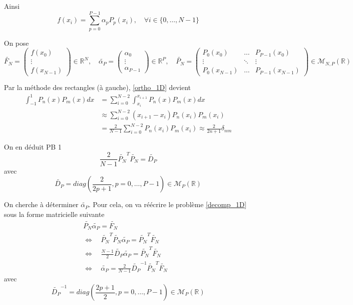 Ainsi
$$f(x_i)=\sum_{p=0}^{P-1}\alpha_p P_p(x_i), \quad \forall i\in\{0,\dots,N-1\}$$

On pose
$$\widetilde{F_N}=\begin{pmatrix}
	f(x_0) \\
	\vdots \\
	f(x_{N-1})
\end{pmatrix}\in\mathbb{R}^N, \quad \widetilde{\alpha_P}=\begin{pmatrix}
	\alpha_0 \\
	\vdots \\
	\alpha_{P-1}
\end{pmatrix}\in\mathbb{R}^P, \quad \widetilde{P_N}=\begin{pmatrix}
	P_0(x_0) & \dots & P_{P-1}(x_0) \\
	\vdots & \ddots & \vdots \\
	P_0(x_{N-1}) & \dots & P_{P-1}(x_{N-1})
\end{pmatrix}\in\mathcal{M}_{N,P}(\mathbb{R})$$

Par la méthode des rectangles (à gauche), \ref{ortho_1D} devient
\begin{align*}
	\int_{-1}^1 P_n(x)P_m(x)dx&=\sum_{i=0}^{N-2}\int_{x_i}^{x_{i+1}}P_n(x)P_m(x)dx \\
	&\approx \sum_{i=0}^{N-2} (x_{i+1}-x_i)P_n(x_i)P_m(x_i) \\
	&=\frac{2}{N-1}\sum_{i=0}^{N-2} P_n(x_i)P_m(x_i) \approx\frac{2}{2n+1}\delta_{nm} 
\end{align*}

On en déduit \color{red}PB 1\color{black}
\begin{equation}
	\frac{2}{N-1}\widetilde{P_N}^T\widetilde{P_N}=\widetilde{D_P}\label{diag_1D}
\end{equation}
avec
$$\widetilde{D_P}=diag\left(\frac{2}{2p+1},p=0,\dots,P-1\right)\in\mathcal{M}_P(\mathbb{R})$$

On cherche à déterminer $\widetilde{\alpha_P}$. Pour cela, on va réécrire le problème \ref{decomp_1D} sous la forme matricielle suivante
\begin{align*}
	\widetilde{P_N}\widetilde{\alpha_P}=\widetilde{F_N}& \\
	\iff \quad \widetilde{P_N}^T\widetilde{P_N}\widetilde{\alpha_P}=\widetilde{P_N}^T\widetilde{F_N}& \\
	\iff \quad \frac{N-1}{2}\widetilde{D_P}\widetilde{\alpha_P}=\widetilde{P_N}^T\widetilde{F_N}& \\
	\iff \quad \boxed{\widetilde{\alpha_P}=\frac{2}{N-1}\widetilde{D_P}^{-1}\widetilde{P_N}^T\widetilde{F_N}}&
\end{align*}
avec
$$\widetilde{D_P}^{-1}=diag\left(\frac{2p+1}{2},p=0,\dots,P-1\right)\in\mathcal{M}_P(\mathbb{R})$$

